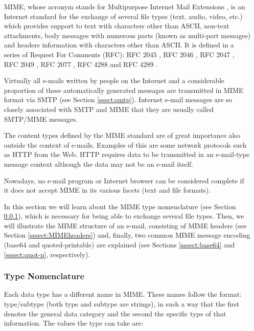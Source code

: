 MIME, whose acronym stands for Multipurpose Internet Mail Extensions \citep{wikimime}, is an Internet standard for the exchange of several file types (text, audio, video, etc.) which provides support to text with characters other than ASCII, non-text attachments, body messages with numerous parts (known as multi-part messages) and headers information with characters other than ASCII. It is defined in a series of Request For Comments (RFC): RFC 2045 \citep{rfc2045}, RFC 2046 \citep{rfc2046}, RFC 2047 \citep{rfc2047}, RFC 2049 \citep{rfc2049}, RFC 2077 \citep{rfc2077}, RFC 4288 \citep{rfc4288} and RFC 4289 \citep{rfc4289}.

Virtually all e-mails written by people on the Internet and a considerable proportion of these automatically generated messages are transmitted in MIME format via SMTP (see Section \ref{ssect:smtp}). Internet e-mail messages are so closely associated with SMTP and MIME that they are usually called SMTP/MIME messages.

The content types defined by the MIME standard are of great importance also outside the context of e-mails. Examples of this are some network protocols such as HTTP from the Web. HTTP requires data to be transmitted in an e-mail-type message context although the data may not be an e-mail itself.

Nowadays, no e-mail program or Internet browser can be considered complete if it does not accept MIME in its various facets (text and file formats). 

In this section we will learn about the MIME type nomenclature (see Section \ref{sssect:MIMEtype}), which is necessary for being able to exchange several file types. Then, we will illustrate the MIME structure of an e-mail, consisting of MIME headers (see Section \ref{sssect:MIMEheaders}) and, finally, two common MIME message encoding (base64 and quoted-printable) are explained (see Sections \ref{sssect:base64} and \ref{sssect:quot-p}, respectively).

\subsubsection{Type Nomenclature}\label{sssect:MIMEtype}

Each data type has a different name in MIME. These names follow the format: type/subtype (both type and subtype are strings), in such a way that the first denotes the general data category and the second the specific type of that information. The values the type can take are:

